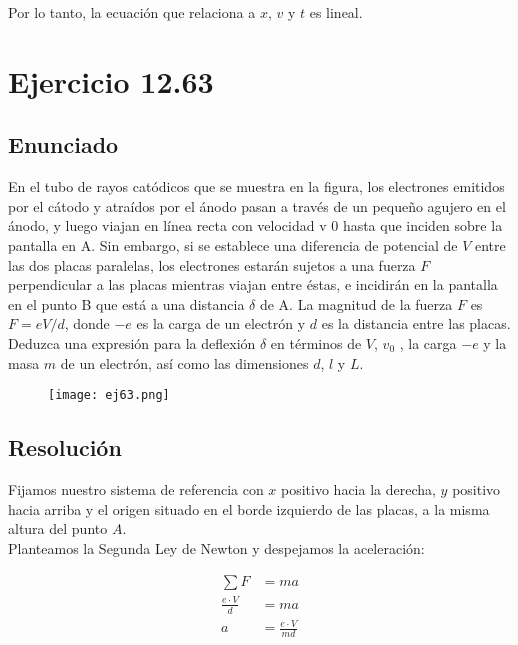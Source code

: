 \documentclass[11pt]{article}
\begin{document}
Por lo tanto, la ecuación que relaciona a $x$, $v$ y $t$ es lineal.

\section*{Ejercicio 12.63}

\subsection*{Enunciado}

En el tubo de rayos catódicos que se muestra en la figura, los electrones 
emitidos por el cátodo y atraídos por el ánodo pasan a través de
un pequeño agujero en el ánodo, y luego viajan en línea recta con velocidad
v 0 hasta que inciden sobre la pantalla en A. Sin embargo, si se establece una
diferencia de potencial de $V$ entre las dos placas paralelas, los electrones 
estarán sujetos a una fuerza $F$ perpendicular a las placas mientras viajan entre
éstas, e incidirán en la pantalla en el punto B que está a una distancia $\delta$ 
de A. La magnitud de la fuerza $F$ es $F = eV/d$, donde $-e$ es la carga de un 
electrón y $d$ es la distancia entre las placas. Deduzca una expresión para la 
deflexión $\delta$ en términos de $V$, $v_0$ , la carga $-e$ y la masa $m$ de un 
electrón, así como las dimensiones $d$, $l$ y $L$.

\begin{figure}[h!]
  \begin{center}
    \texttt{[image: ej63.png]}
  \end{center}
\end{figure}


\subsection*{Resolución}

Fijamos nuestro sistema de referencia con $x$ positivo hacia la derecha, $y$
positivo hacia arriba y el origen situado en el borde izquierdo de las placas, a 
la misma altura del punto $A$. \\

Planteamos la Segunda Ley de Newton y despejamos la aceleración:

\begin{align*}
  \sum F &= m a \\
  \frac{e \cdot V}{d} &= m a \\
  a &= \frac{e \cdot V}{md}
\end{align*}
\end{document}
